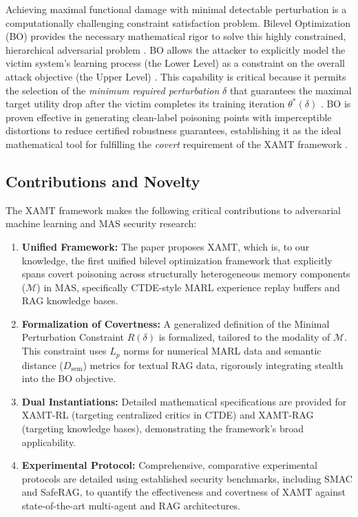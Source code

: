 \documentclass[conference]{IEEEtran}
\begin{document}
Achieving maximal functional damage with minimal detectable perturbation is a computationally challenging constraint satisfaction problem. Bilevel Optimization (BO) provides the necessary mathematical rigor to solve this highly constrained, hierarchical adversarial problem \cite{Ref21, Ref22}. BO allows the attacker to explicitly model the victim system's learning process (the Lower Level) as a constraint on the overall attack objective (the Upper Level) \cite{Ref23}. This capability is critical because it permits the selection of the \textit{minimum required perturbation} $\delta$ that guarantees the maximal target utility drop after the victim completes its training iteration $\theta^*(\delta)$ \cite{Ref24, Ref25}. BO is proven effective in generating clean-label poisoning points with imperceptible distortions to reduce certified robustness guarantees, establishing it as the ideal mathematical tool for fulfilling the \textit{covert} requirement of the XAMT framework \cite{Ref19, Ref20}.

\subsection{Contributions and Novelty}
The XAMT framework makes the following critical contributions to adversarial machine learning and MAS security research:

\begin{enumerate}
    \item \textbf{Unified Framework:} The paper proposes XAMT, which is, to our knowledge, the first unified bilevel optimization framework that explicitly spans covert poisoning across structurally heterogeneous memory components ($\mathcal{M}$) in MAS, specifically CTDE-style MARL experience replay buffers and RAG knowledge bases.
    \item \textbf{Formalization of Covertness:} A generalized definition of the Minimal Perturbation Constraint $R(\delta)$ is formalized, tailored to the modality of $\mathcal{M}$. This constraint uses $L_p$ norms for numerical MARL data and semantic distance ($D_{\text{sem}}$) metrics for textual RAG data, rigorously integrating stealth into the BO objective.
    \item \textbf{Dual Instantiations:} Detailed mathematical specifications are provided for XAMT-RL (targeting centralized critics in CTDE) and XAMT-RAG (targeting knowledge bases), demonstrating the framework's broad applicability.
    \item \textbf{Experimental Protocol:} Comprehensive, comparative experimental protocols are detailed using established security benchmarks, including SMAC and SafeRAG, to quantify the effectiveness and covertness of XAMT against state-of-the-art multi-agent and RAG architectures.
\end{enumerate}
\end{document}
